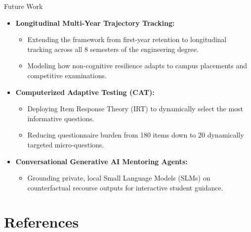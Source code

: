 \documentclass{beamer}
\begin{document}
\begin{frame}{Future Work}
  \begin{itemize}\setlength{\itemsep}{9pt}
    \item \textbf{Longitudinal Multi-Year Trajectory Tracking:}
    \begin{itemize}\setlength{\itemsep}{4pt}
      \item Extending the framework from first-year retention to longitudinal tracking across all 8 semesters of the engineering degree.
      \item Modeling how non-cognitive resilience adapts to campus placements and competitive examinations.
    \end{itemize}
    
    \item \textbf{Computerized Adaptive Testing (CAT):}
    \begin{itemize}\setlength{\itemsep}{4pt}
      \item Deploying Item Response Theory (IRT) to dynamically select the most informative questions.
      \item Reducing questionnaire burden from 180 items down to 20 dynamically targeted micro-questions.
    \end{itemize}
    
    \item \textbf{Conversational Generative AI Mentoring Agents:}
    \begin{itemize}\setlength{\itemsep}{4pt}
      \item Grounding private, local Small Language Models (SLMs) on counterfactual recourse outputs for interactive student guidance.
    \end{itemize}
  \end{itemize}
\end{frame}

\section{References}
\end{document}

